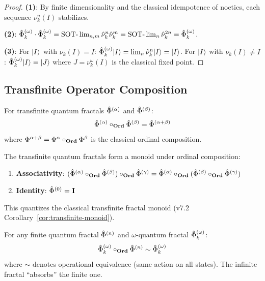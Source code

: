 \begin{proof}
\textbf{(1)}: By finite dimensionality and the classical idempotence of noetics, each sequence $\nu_k^n(I)$ stabilizes.

\textbf{(2)}: $\hat{\Phi}^{(\omega)}_k \cdot \hat{\Phi}^{(\omega)}_k = \mathrm{SOT}\text{-}\lim_{n,m} \hat{\nu}_k^n \hat{\nu}_k^m = \mathrm{SOT}\text{-}\lim_{n} \hat{\nu}_k^{2n} = \hat{\Phi}^{(\omega)}_k$.

\textbf{(3)}: For $|I\rangle$ with $\nu_k(I) = I$: $\hat{\Phi}^{(\omega)}_k|I\rangle = \lim_n \hat{\nu}_k^n|I\rangle = |I\rangle$.
For $|I\rangle$ with $\nu_k(I) \neq I$: $\hat{\Phi}^{(\omega)}_k|I\rangle = |J\rangle$ where $J = \nu_k^\omega(I)$ is the classical fixed point.
\end{proof}

\subsection{Transfinite Operator Composition}

\begin{definition}
\label{def:ordinal-op-composition}
For transfinite quantum fractals $\hat{\Phi}^{(\alpha)}$ and $\hat{\Phi}^{(\beta)}$:
\[
\hat{\Phi}^{(\alpha)} \circ_{\mathbf{Ord}} \hat{\Phi}^{(\beta)} = \hat{\Phi}^{(\alpha+\beta)}
\]
where $\Phi^{\alpha+\beta} = \Phi^{\alpha} \circ_{\mathbf{Ord}} \Phi^{\beta}$ is the classical ordinal composition.
\end{definition}

\begin{theorem}
\label{thm:transfinite-qmonoid}
The transfinite quantum fractals form a monoid under ordinal composition:
\begin{enumerate}
  \item \textbf{Associativity}: $(\hat{\Phi}^{(\alpha)} \circ_{\mathbf{Ord}} \hat{\Phi}^{(\beta)}) \circ_{\mathbf{Ord}} \hat{\Phi}^{(\gamma)} = \hat{\Phi}^{(\alpha)} \circ_{\mathbf{Ord}} (\hat{\Phi}^{(\beta)} \circ_{\mathbf{Ord}} \hat{\Phi}^{(\gamma)})$
  \item \textbf{Identity}: $\hat{\Phi}^{(0)} = \mathbf{I}$
\end{enumerate}
This quantizes the classical transfinite fractal monoid (v7.2 Corollary~\ref{cor:transfinite-monoid}).
\end{theorem}

\begin{corollary}
\label{cor:transfinite-absorption}
For any finite quantum fractal $\hat{\Phi}^{(n)}$ and $\omega$-quantum fractal $\hat{\Phi}^{(\omega)}_k$:
\[
\hat{\Phi}^{(\omega)}_k \circ_{\mathbf{Ord}} \hat{\Phi}^{(n)} \sim \hat{\Phi}^{(\omega)}_k
\]
where $\sim$ denotes operational equivalence (same action on all states). The infinite fractal ``absorbs'' the finite one.
\end{corollary}

